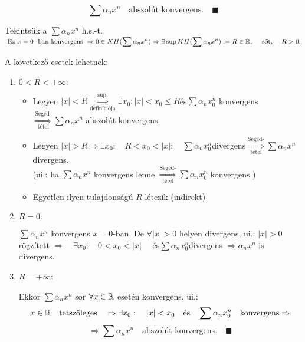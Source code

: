\documentclass[a4paper,11.5pt]{article}
\begin{document}
\begin{enumerate}
\begin{itemize}[~~~~~~~~~]
			\[ \sum\alpha_nx^n\quad \text{abszolút konvergens.}\quad \blacksquare \]
		\end{itemize}
		Tekintsük a $\displaystyle\sum\alpha_nx^n$ h.s.-t. $ \displaystyle\text{ Ez }  x=0\text{~-ban konvergens }   \Rightarrow 0 \in KH(\sum\alpha_nx^n) \Rightarrow \exists \sup KH(\sum\alpha_nx^n):=R\in\overline{\mathbb{R}},\quad\text{ sőt, }\quad R>0.$
		
		A következő esetek lehetnek:
		\begin{enumerate}
			\item $0<R<+\infty:$
			\begin{itemize}
				\item Legyen $|x|<R \overset{\text{sup.}}{\underset{\text{definíciója}}{\Longrightarrow}} \exists x_0: |x|<x_0\leq R$\quad  és\quad $ \sum\alpha_nx^n_0$ \quad konvergens $\overset{\text{Segéd-}}{\underset{\text{tétel}}{\Longrightarrow}} \sum\alpha_nx^n$ abszolút konvergens.\\
				
				\item Legyen $|x|>R \Rightarrow \exists x_0:\quad  R<x_0<|x|:\quad \sum\alpha_nx^n_0$\quad divergens\quad $\overset{\text{Segéd-}}{\underset{\text{tétel}}{\Longrightarrow}} \sum \alpha_nx^n$ \quad divergens.\\
				
				(ui.: ha $\sum \alpha_nx^n$ konvergens lenne $\overset{\text{Segéd-}}{\underset{\text{tétel}}{\Longrightarrow}} \sum \alpha_n x_0^n$ konvergens {\Large\Lightning})
				
				\item Egyetlen ilyen tulajdonságú $R$ létezik (indirekt)
			\end{itemize}
			\item $R=0:$
			
			$ \displaystyle\sum\alpha_nx^n$ \quad konvergens $x=0$-ban. De $\forall |x|>0$ helyen divergens, ui.: \quad $|x|>0$ rögzített \quad $\Rightarrow\quad \exists x_0: \quad 0<x_0<|x| \quad$ és\quad $\displaystyle\sum\alpha_nx^n_0$\quad divergens $\Rightarrow \alpha_nx^n$ is divergens.
			
			\item $R=+\infty$:
			
			Ekkor $\sum\alpha_nx^n$ sor $\forall x \in \mathbb{R}$ esetén konvergens. ui.:
			\[ x\in \mathbb{R} \quad \text{tetszőleges}\quad \Rightarrow \exists x_0: \quad |x|<x_0\quad \text{és}\quad \sum\alpha_nx^n_0 \quad \text{konvergens}\Rightarrow\]\[ \Rightarrow\sum\alpha_nx^n\quad \text{abszolút konvergens.} \quad \blacksquare\]
		\end{enumerate}
		

\end{enumerate}
\end{document}
